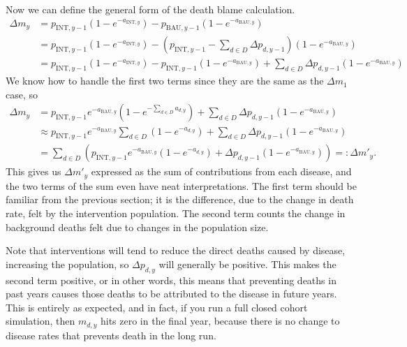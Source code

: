 \documentclass[]{article}
\begin{document}
Now we can define the general form of the death blame calculation.
\begin{align*}
	\Delta m_y &= p_{\text{INT}, y - 1} \left(1 - e^{-a_{\text{INT}, y}}\right) - p_{\text{BAU}, y - 1} \left(1 - e^{-a_{\text{BAU}, y}}\right) \\
	&= p_{\text{INT}, y - 1} \left(1 - e^{-a_{\text{INT}, y}}\right) - \left(p_{\text{INT}, y - 1} - \sum_{d \in D} \Delta p_{d, y - 1} \right)  \left(1 - e^{-a_{\text{BAU}, y}}\right) \\
	&= p_{\text{INT}, y - 1} \left(1 - e^{-a_{\text{INT}, y}}\right) - p_{\text{INT}, y - 1} \left(1 - e^{-a_{\text{BAU}, y}}\right)  + \sum_{d \in D} \Delta p_{d, y - 1} \left(1 - e^{-a_{\text{BAU}, y}}\right)
\end{align*}
We know how to handle the first two terms since they are the same as the $\Delta m_1$ case, so 
\begin{align*}
	\Delta m_y &= p_{\text{INT}, y-1} e^{-a_{\text{BAU}, y}} \left(1 - e^{-\sum_{d \in D} a_{d, y}}\right)
	 + \sum_{d \in D} \Delta p_{d, y - 1} \left(1 - e^{-a_{\text{BAU}, y}}\right) \\
	 &\approx p_{\text{INT}, y - 1} e^{-a_{\text{BAU}, y}} \sum_{d \in D} \left(1 - e^{-a_{d, y}}\right)
	 + \sum_{d \in D} \Delta p_{d, y - 1} \left(1 - e^{-a_{\text{BAU}, y}}\right) \\
	 &= \sum_{d \in D} \left(p_{\text{INT}, y - 1} e^{-a_{\text{BAU}, y}} \left(1 - e^{-a_{d, y}}\right)
	 + \Delta p_{d, y - 1} \left(1 - e^{-a_{\text{BAU}, y}}\right) \right) =: \Delta m'_y.
\end{align*}
This gives us $\Delta m'_y$ expressed as the sum of contributions from each disease, and the two terms of the sum even have neat interpretations. The first term should be familiar from the previous section; it is the difference, due to the change in death rate, felt by the intervention population. The second term counts the change in background deaths felt due to changes in the population size.

Note that interventions will tend to reduce the direct deaths caused by disease, increasing the population, so $\Delta p_{d, y}$ will generally be positive. This makes the second term positive, or in other words, this means that preventing deaths in past years causes those deaths to be attributed to the disease in future years. This is entirely as expected, and in fact, if you run a full closed cohort simulation, then $m_{d, y}$ hits zero in the final year, because there is no change to disease rates that prevents death in the long run.
\end{document}
